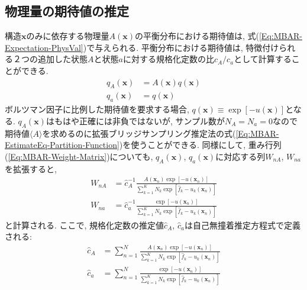 \subsection{物理量の期待値の推定}
構造$\bm{x}$のみに依存する物理量$A(\bm{x})$の平衡分布における期待値は, 式(\ref{Eq:MBAR-Expectation-PhysVal})で与えられる. 
平衡分布における期待値は, 特徴付けられる２つの追加した状態$A$と状態$a$に対する規格化定数の比$c_{A}/c_{a}$として計算することができる. 
\begin{align}
    q_{A}(\bm{x}) &= A(\bm{x}) q(\bm{x}) \\
    q_{a}(\bm{x}) &= q(\bm{x})
\end{align}
ボルツマン因子に比例した期待値を要求する場合, $q(\bm{x}) \equiv \exp[-u(\bm{x})]$となる. 
$q_{A}(\bm{x})$はもはや正確には非負ではないが, サンプル数が$N_{A} = N_{a} = 0$なので期待値$\langle A \rangle$を求めるのに拡張ブリッジサンプリング推定法の式(\ref{Eq:MBAR-EstimateEq-Partition-Function})を使うことができる. 
同様にして, 重み行列(\ref{Eq:MBAR-Weight-Matrix})についても, $q_{A}(\bm{x})$, $q_{a}(\bm{x})$に対応する列$W_{nA}$, $W_{na}$を拡張すると, 
\begin{align}
    W_{nA} &=
    \hat{c}_{A}^{-1}
    \frac{
        A(\bm{x}_{n}) \exp[-u(\bm{x}_{n})]
    }{
        \sum_{k=1}^{K} N_{k} \exp[\hat{f}_{k} - u_{k}(\bm{x}_{n})]
    }
    \\
    W_{na} &=
    \hat{c}_{a}^{-1}
    \frac{
        \exp[-u(\bm{x}_{n})]
    }{
        \sum_{k=1}^{K} N_{k} \exp[\hat{f}_{k} - u_{k}(\bm{x}_{n})]
    }
\end{align}
と計算される. ここで, 規格化定数の推定値$\hat{c}_{A}$, $\hat{c}_{a}$は自己無撞着推定方程式で定義される:
\begin{align}
    \hat{c}_{A} &=
    \sum_{n=1}^{N}
    \frac{
        A(\bm{x}_{n}) \exp[-u(\bm{x}_{n})]
    }{
        \sum_{k=1}^{K} N_{k} \exp[\hat{f}_{k} - u_{k}(\bm{x}_{n})]
    }
    \\
    \hat{c}_{a} &=
    \sum_{n=1}^{N}
    \frac{
        \exp[-u(\bm{x}_{n})]
    }{
        \sum_{k=1}^{K} N_{k} \exp[\hat{f}_{k} - u_{k}(\bm{x}_{n})]
    }
\end{align}

